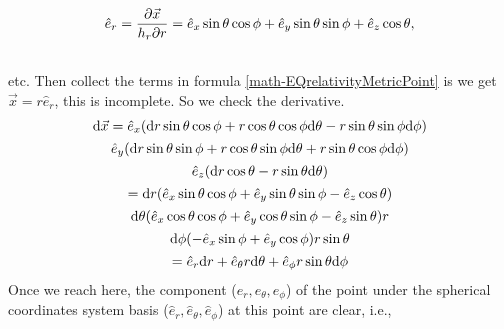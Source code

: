 \documentclass[letterpaper,10pt,english]{sphinxmanual}
\begin{document}
\begin{gather}
\begin{split}\hat e_r=\frac{\partial \vec x}{h_r\partial r}=\hat e_x \sin\theta\cos\phi+\hat e_y \sin\theta\sin\phi+\hat e_z \cos\theta,\end{split}\notag\\\begin{split}\end{split}\notag
\end{gather}
etc. Then collect the terms in formula \eqref{math-EQrelativityMetricPoint} is we get $\vec x=r\hat e_r$, this is incomplete. So we check the derivative.
\begin{gather}
\begin{split}\mathrm d\vec x =  \hat e_x (\mathrm dr \sin\theta\cos\phi+r\cos\theta\cos\phi\mathrm d\theta-r\sin\theta\sin\phi\mathrm d\phi)\end{split}\notag\\\begin{split}\hat e_y (\mathrm dr\sin\theta\sin\phi+r\cos\theta\sin\phi\mathrm d\theta+r\sin\theta\cos\phi\mathrm d\phi)\end{split}\notag\\\begin{split}\hat e_z (\mathrm dr\cos\theta-r\sin\theta\mathrm d\theta)\end{split}\notag\\\begin{split} = \mathrm dr(\hat e_x\sin\theta\cos\phi +\hat e_y \sin\theta\sin\phi -\hat e_z \cos\theta)\end{split}\notag\\\begin{split}\mathrm d\theta (\hat e_x\cos\theta\cos\phi +\hat e_y \cos\theta\sin\phi - \hat e_z \sin\theta)r\end{split}\notag\\\begin{split}\mathrm d\phi (-\hat e_x\sin\phi +\hat e_y \cos\phi)r\sin\theta\end{split}\notag\\\begin{split}=\hat e_r\mathrm dr+\hat e_\theta r\mathrm d\theta +\hat e_\phi r\sin\theta\mathrm d \phi\end{split}\notag
\end{gather}
Once we reach here, the component ($e_r ,e_\theta, e_\phi$) of the point under the spherical coordinates system basis ($\hat e_r, \hat e_\theta, \hat e_\phi$) at this point are clear, i.e.,
\end{document}
